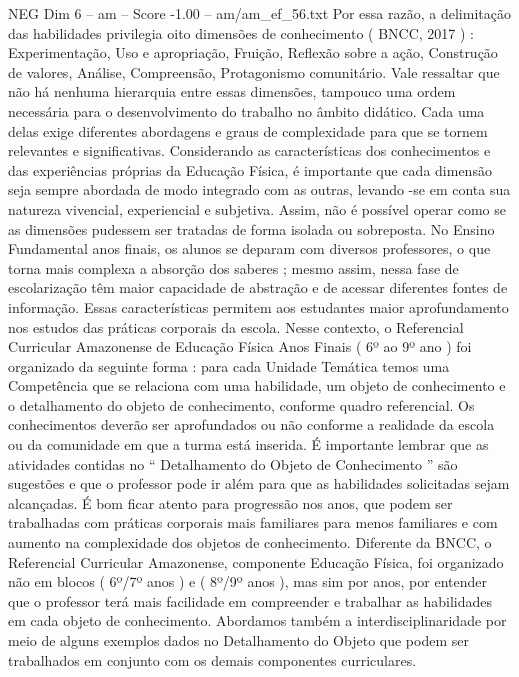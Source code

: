 \begin{textsample}{NEG Dim 6 – am – Score -1.00 – am/am\_ef\_56.txt}
Por essa razão, a delimitação das habilidades privilegia oito dimensões de conhecimento ( BNCC, 2017 ) : Experimentação, Uso e apropriação, Fruição, Reflexão sobre a ação, Construção de valores, Análise, Compreensão, Protagonismo comunitário.
Vale ressaltar que não há nenhuma hierarquia entre essas dimensões, tampouco uma ordem necessária para o desenvolvimento do trabalho no âmbito didático.
Cada uma delas exige diferentes abordagens e graus de complexidade para que se tornem relevantes e significativas.
Considerando as características dos conhecimentos e das experiências próprias da Educação Física, é importante que cada dimensão seja sempre abordada de modo integrado com as outras, levando -se em conta sua natureza vivencial, experiencial e subjetiva.
Assim, não é possível operar como se as dimensões pudessem ser tratadas de forma isolada ou sobreposta.
No Ensino Fundamental anos finais, os alunos se deparam com diversos professores, o que torna mais complexa a absorção dos saberes ; mesmo assim, nessa fase de escolarização têm maior capacidade de abstração e de acessar diferentes fontes de informação.
Essas características permitem aos estudantes maior aprofundamento nos estudos das práticas corporais da escola.
Nesse contexto, o Referencial Curricular Amazonense de Educação Física Anos Finais ( 6º ao 9º ano ) foi organizado da seguinte forma : para cada Unidade Temática temos uma Competência que se relaciona com uma habilidade, um objeto de conhecimento e o detalhamento do objeto de conhecimento, conforme quadro referencial.
Os conhecimentos deverão ser aprofundados ou não conforme a realidade da escola ou da comunidade em que a turma está inserida.
É importante lembrar que as atividades contidas no “ Detalhamento do Objeto de Conhecimento ” são sugestões e que o professor pode ir além para que as habilidades solicitadas sejam alcançadas.
É bom ficar atento para progressão nos anos, que podem ser trabalhadas com práticas corporais mais familiares para menos familiares e com aumento na complexidade dos objetos de conhecimento.
Diferente da BNCC, o Referencial Curricular Amazonense, componente Educação Física, foi organizado não em blocos ( 6º/7º anos ) e ( 8º/9º anos ), mas sim por anos, por entender que o professor terá mais facilidade em compreender e trabalhar as habilidades em cada objeto de conhecimento.
Abordamos também a interdisciplinaridade por meio de alguns exemplos dados no Detalhamento do Objeto que podem ser trabalhados em conjunto com os demais componentes curriculares.

\end{textsample}
